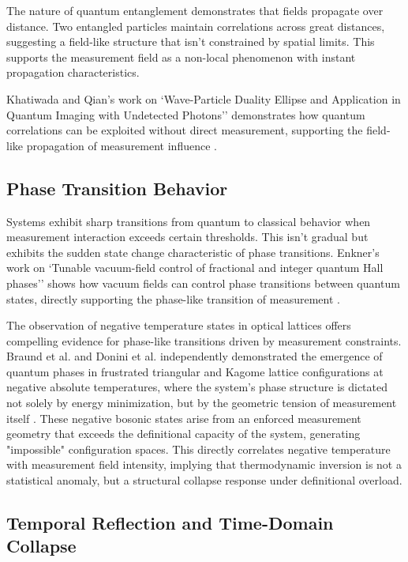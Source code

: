 The nature of quantum entanglement demonstrates that fields propagate over distance. Two entangled particles maintain correlations across great distances, suggesting a field-like structure that isn't constrained by spatial limits. This supports the measurement field as a non-local phenomenon with instant propagation characteristics.

Khatiwada and Qian's work on `Wave-Particle Duality Ellipse and Application in Quantum Imaging with Undetected Photons'' demonstrates how quantum correlations can be exploited without direct measurement, supporting the field-like propagation of measurement influence \cite{khatiwada_wave-particle_2025}.

\subsection{Phase Transition Behavior}

Systems exhibit sharp transitions from quantum to classical behavior when measurement interaction exceeds certain thresholds. This isn't gradual but exhibits the sudden state change characteristic of phase transitions. Enkner's work on `Tunable vacuum-field control of fractional and integer quantum Hall phases'' shows how vacuum fields can control phase transitions between quantum states, directly supporting the phase-like transition of measurement \cite{enkner_tunable_2025}.

The observation of negative temperature states in optical lattices offers compelling evidence for phase-like transitions driven by measurement constraints. Braund et al. and Donini et al. independently demonstrated the emergence of quantum phases in frustrated triangular and Kagome lattice configurations at negative absolute temperatures, where the system's phase structure is dictated not solely by energy minimization, but by the geometric tension of measurement itself \cite{braund_negative_2024}. \cite{donini_quantum_2024} These negative bosonic states arise from an enforced measurement geometry that exceeds the definitional capacity of the system, generating "impossible" configuration spaces. This directly correlates negative temperature with measurement field intensity, implying that thermodynamic inversion is not a statistical anomaly, but a structural collapse response under definitional overload.

\subsection{Temporal Reflection and Time-Domain Collapse}

